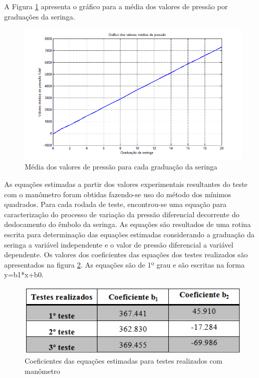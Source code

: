 A Figura \ref{mediapressaoseringa} apresenta o gráfico para a média dos valores de pressão por graduações da seringa.

\begin{figure}[H]
		\centering
			\includegraphics[scale=0.8]{figuras/mediapressaoseringa.png}
		\caption{Média dos valores de pressão para cada graduação da seringa}
		\label{mediapressaoseringa}
\end{figure}

As equações estimadas a partir dos valores experimentais resultantes do teste com o manômetro foram obtidas fazendo-se uso do método dos mínimos quadrados. Para cada rodada de teste, encontrou-se uma equação para caracterização do processo de variação da pressão diferencial decorrente do deslocamento do êmbolo da seringa. As equações são resultados de uma rotina escrita para determinação das equações estimadas considerando a graduação da seringa a variável independente e o valor de pressão diferencial a variável dependente. Os valores dos coeficientes das equações dos testes realizados são apresentados na figura \ref{equacoesmanometro}. As equações são de 1º grau e são escritas na forma y=b1*x+b0.

\begin{figure}[H]
		\centering
			\includegraphics[scale=1.0]{figuras/equacoesmanometro.png}
		\caption{Coeficientes das equações estimadas para testes realizados com manômetro}
		\label{equacoesmanometro}
\end{figure}

